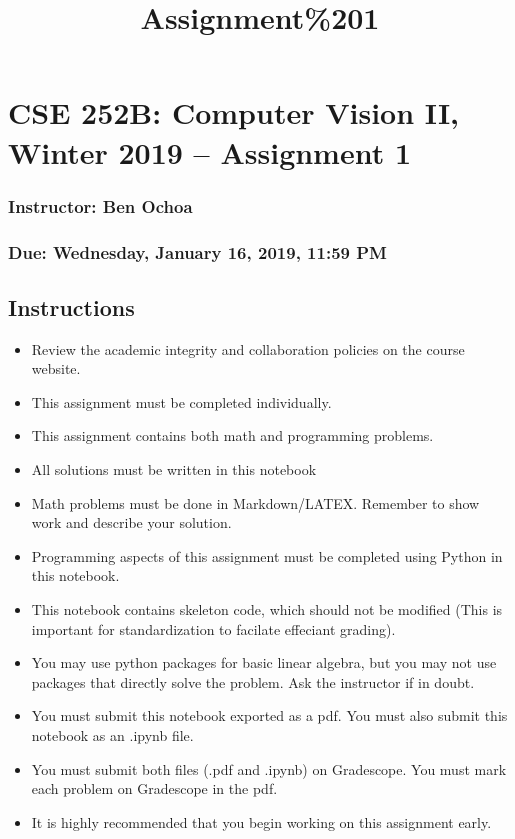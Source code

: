 \documentclass[11pt]{article}
\title{Assignment\%201}
\providecommand{\tightlist}{%
      \setlength{\itemsep}{0pt}\setlength{\parskip}{0pt}}
\begin{document}
    
    
    \maketitle
    
    

    
    \section{CSE 252B: Computer Vision II, Winter 2019 -- Assignment
1}\label{cse-252b-computer-vision-ii-winter-2019-assignment-1}

\subsubsection{Instructor: Ben Ochoa}\label{instructor-ben-ochoa}

\subsubsection{Due: Wednesday, January 16, 2019, 11:59
PM}\label{due-wednesday-january-16-2019-1159-pm}

    \subsection{Instructions}\label{instructions}

\begin{itemize}
\tightlist
\item
  Review the academic integrity and collaboration policies on the course
  website.
\item
  This assignment must be completed individually.
\item
  This assignment contains both math and programming problems.
\item
  All solutions must be written in this notebook
\item
  Math problems must be done in Markdown/LATEX. Remember to show work
  and describe your solution.
\item
  Programming aspects of this assignment must be completed using Python
  in this notebook.
\item
  This notebook contains skeleton code, which should not be modified
  (This is important for standardization to facilate effeciant grading).
\item
  You may use python packages for basic linear algebra, but you may not
  use packages that directly solve the problem. Ask the instructor if in
  doubt.
\item
  You must submit this notebook exported as a pdf. You must also submit
  this notebook as an .ipynb file.
\item
  You must submit both files (.pdf and .ipynb) on Gradescope. You must
  mark each problem on Gradescope in the pdf.
\item
  It is highly recommended that you begin working on this assignment
  early.
\end{itemize}
\end{document}
